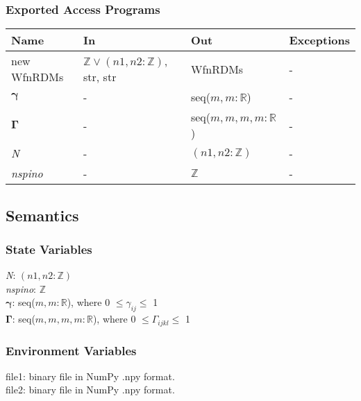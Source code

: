 \documentclass[12pt, titlepage]{article}
\begin{document}
\subsubsection{Exported Access Programs}

\begin{center}
	\begin{tabular}{p{3cm} p{4cm} p{4cm} p{2cm}}
		\hline
		\textbf{Name} & \textbf{In} & \textbf{Out} & \textbf{Exceptions} \\
		\hline
		new WfnRDMs& $\mathbb{Z} \lor (n1, n2:\mathbb{Z})$, str, 
		str& WfnRDMs& -\\
		$\boldsymbol{\gamma}$& -& seq($m,m:\mathbb{R}$)& -\\
		$\boldsymbol{\Gamma}$& -& seq($m,m,m,m:\mathbb{R}$)& -\\
		\textit{N} & -& $(n1, n2:\mathbb{Z})$& -\\
		\textit{nspino} & -& $\mathbb{Z}$& -\\
		\hline
	\end{tabular}
\end{center}

\subsection{Semantics}

\subsubsection{State Variables}

\textit{N}: $(n1, n2:\mathbb{Z})$\\
\textit{nspino}: $\mathbb{Z}$\\
$\boldsymbol{\gamma}$: seq($m,m:\mathbb{R}$), where 0 $\le \gamma_{ij} \le$ 1\\
$\boldsymbol{\Gamma}$: seq($m,m,m,m:\mathbb{R}$), where 0 $\le \Gamma_{ijkl} 
\le$ 1\\

\subsubsection{Environment Variables}

file1: binary file in NumPy .npy format.\\
file2: binary file in NumPy .npy format.
\end{document}
